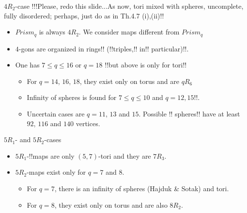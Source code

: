 \documentclass[%
pdf,
colorBG,
slideColor,
]{prosper}
\begin{document}
\begin{slide}{$4R_2$-case}
!!!Please, redo this slide...As now, tori mixed with spheres, uncomplete,
fully disordered; perhaps, just do as in Th.4.7 (i),(ii)!!
\begin{itemize}
\item $Prism_q$ is always $4R_2$. We consider maps different from $Prism_q$
\item $4$-gons are organized in rings!! (!!triples,!! in!! particular)!!.
\item One has $7\leq q\leq 16$ or $q=18$
!!but above is only for tori!!
\begin{itemize}
\item For $q=14$, $16$, $18$, they exist only on torus and are $qR_6$
\item Infinity of spheres is found for $7\leq q\leq 10$ and $q=12,15!!$.
\item Uncertain cases are $q=11$, $13$ and $15$. Possible 
!!%
spheres!! have
at least $92$, $116$ and $140$ vertices.
\end{itemize}
\end{itemize}

\end{slide}





\begin{slide}{$5R_1$- and $5R_2$-cases}
\begin{itemize}
\item $5R_1$-!!maps are only $(5,7)$-tori and they are $7R_3$.
\item $5R_2$-maps exist only for $q=7$ and $8$.
\begin{itemize}
\item For $q=7$, there is an infinity of spheres (Hajduk \& Sotak) and tori.
\begin{center}
\begin{minipage}{5.0cm}
\centering
{}\par
\end{minipage}
\begin{minipage}{5cm}
\centering
{}\par
\end{minipage}
\end{center}
\item For $q=8$, they exist only on torus and are also $8R_2$.
\end{itemize}

\end{itemize}

\end{slide}
\end{document}
